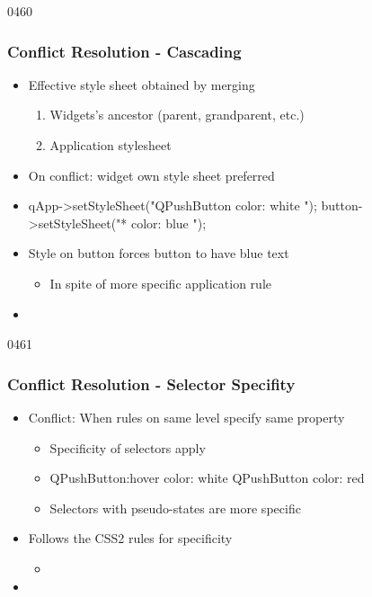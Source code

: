 \begin{slide}[fragile]{0460}\frametitle{Conflict Resolution - Cascading}\label{style_sheet_conflict_resolution}
  \begin{itemize}
  \item Effective style sheet obtained by merging
    \begin{enumerate}
    \item Widgets's ancestor (parent, grandparent, etc.)
    \item Application stylesheet
    \end{enumerate}
  \item On conflict: widget own style sheet preferred
  \item[]
    \begin{cpp}
qApp->setStyleSheet("QPushButton { color: white }");
button->setStyleSheet("* { color: blue }");
    \end{cpp}
  \item Style on button forces button to have blue text
    \begin{itemize}
    \item In spite of more specific application rule
    \end{itemize}
\item[] 
\end{itemize}
\end{slide}

\begin{slide}[fragile]{0461}\frametitle{Conflict Resolution - Selector Specifity}
\begin{itemize}
\item Conflict: When rules on same level specify same property
  \begin{itemize}
  \item Specificity of selectors apply
\item[]
  \begin{cpp}
QPushButton:hover { color: white }
QPushButton { color: red }    
  \end{cpp}
\item Selectors with pseudo-states are more specific
  \end{itemize}
\item Follows the CSS2 rules for specificity
  \begin{itemize}
  \item [] 
  \end{itemize}
  
\item[] 
\end{itemize}
\end{slide}


